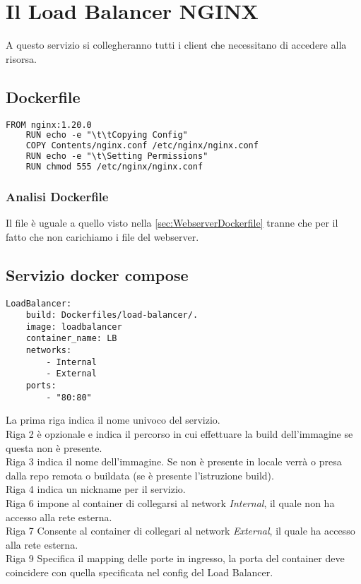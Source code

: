 \documentclass[../DocumentazioneProgetto.tex]{subfiles}
\begin{document}
	\section{Il Load Balancer NGINX} 
	A questo servizio si collegheranno tutti i client che necessitano di accedere alla risorsa.
	\subsection{Dockerfile} 
\begin{lstlisting}[language=XML, caption=Dockerfile Load Balancer NGINX] 
	FROM nginx:1.20.0
	RUN echo -e "\t\tCopying Config"
	COPY Contents/nginx.conf /etc/nginx/nginx.conf
	RUN echo -e "\t\Setting Permissions"
	RUN chmod 555 /etc/nginx/nginx.conf\end{lstlisting}
	\subsubsection{Analisi Dockerfile} 
	Il file è uguale a quello visto nella \autoref{sec:WebserverDockerfile} tranne che per il fatto che non carichiamo i file del webserver.
	\subsection{Servizio docker compose}
	\label{sec:LoadBalancerDockerCompose}
	\begin{lstlisting}[caption=Load Balancer Docker Compose] 
LoadBalancer:
	build: Dockerfiles/load-balancer/.
	image: loadbalancer
	container_name: LB
	networks:
		- Internal
		- External
	ports:
		- "80:80"\end{lstlisting}
		La prima riga indica il nome univoco del servizio.\\
		Riga 2 è opzionale e indica il percorso in cui effettuare la build dell'immagine se questa non è presente.\\
		Riga 3 indica il nome dell'immagine. Se non è presente in locale verrà o presa dalla repo remota o buildata (se è presente l'istruzione build).\\
		Riga 4 indica un nickname per il servizio.\\
		Riga 6 impone al container di collegarsi al network \textit{Internal}, il quale non ha accesso alla rete esterna.\\
		Riga 7 Consente al container di collegari al network \textit{External}, il quale ha accesso alla rete esterna.\\
		Riga 9 Specifica il mapping delle porte in ingresso, la porta del container deve coincidere con quella specificata nel config del Load Balancer.
\end{document}
